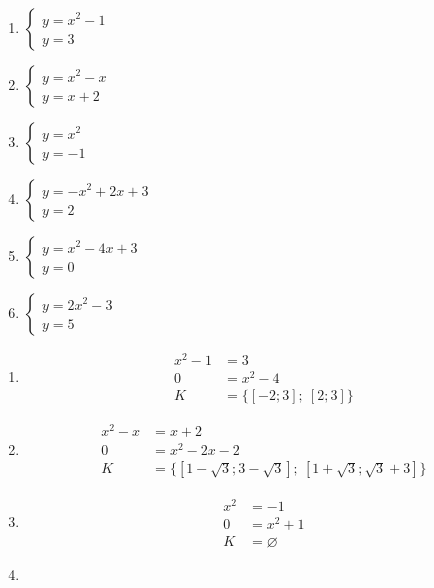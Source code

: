 \documentclass[11pt,a4paper]{article}
\begin{document}
\begin{zadaniReseniBox}[title={Domácí úkol}]
\begin{enumerate}[label=\alph*),itemsep=2pt]
\item $\begin{cases}y=x^{2} - 1\\y=3\end{cases}$
\item $\begin{cases}y=x^{2} - x\\y=x + 2\end{cases}$
\item $\begin{cases}y=x^{2}\\y=-1\end{cases}$
\item $\begin{cases}y=- x^{2} + 2x + 3\\y=2\end{cases}$
\item $\begin{cases}y=x^{2} - 4x + 3\\y=0\end{cases}$
\item $\begin{cases}y=2x^{2} - 3\\y=5\end{cases}$
\end{enumerate}
\tcblower
\begin{enumerate}[label=\alph*),itemsep=2pt]
\item
\[\begin{aligned}
x^{2} - 1&=3\\[2pt]
0&=x^{2} - 4\\[2pt]
K&=\{[-2;3];\ [2;3]\}
\end{aligned}\]
\item
\[\begin{aligned}
x^{2} - x&=x + 2\\[2pt]
0&=x^{2} - 2x - 2\\[2pt]
K&=\{[1 - \sqrt{3};3 - \sqrt{3}];\ [1 + \sqrt{3};\sqrt{3} + 3]\}
\end{aligned}\]
\item
\[\begin{aligned}
x^{2}&=-1\\[2pt]
0&=x^{2} + 1\\[2pt]
K&=\varnothing
\end{aligned}\]
\item
\[\begin{aligned}

\end{aligned}\]
\end{enumerate}
\end{zadaniReseniBox}
\end{document}

